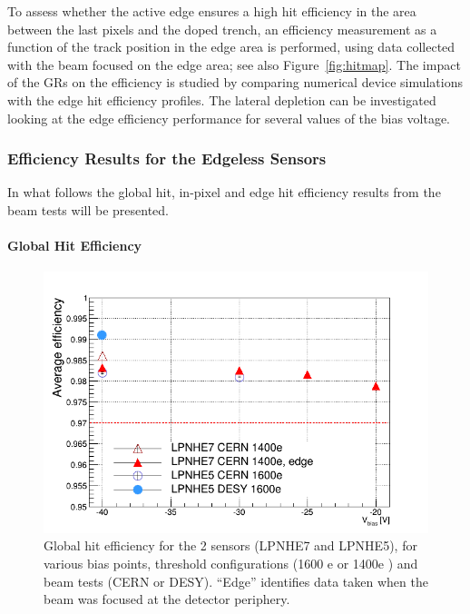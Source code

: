 To assess whether the active edge ensures a high hit efficiency in the  area between the last pixels and the doped trench, an efficiency measurement as a function of the track position in the edge area is performed, using data collected with the beam focused on the edge area; see also Figure~\ref{fig:hitmap}.
The impact of the GRs on the efficiency is studied by comparing numerical device simulations with the edge hit efficiency profiles. The lateral depletion can be investigated looking at the edge efficiency performance
 for several values of the bias voltage.

\subsubsection{Efficiency Results for the Edgeless Sensors}

In what follows the global hit, in-pixel and edge hit efficiency results from the beam tests  will be presented.

\paragraph{Global Hit Efficiency}
\begin{figure}[htbp]
\centering %
\includegraphics[width=.65\textwidth,origin=c,angle=0]{eff_open.png}

\caption{\label{fig:eff} Global hit efficiency for the 2 sensors (LPNHE7 and LPNHE5), for various bias points, threshold configurations (1600 e or 1400e ) and beam tests (CERN or DESY). ``Edge'' identifies data taken when the
beam was focused at the detector periphery.}



\end{figure}

